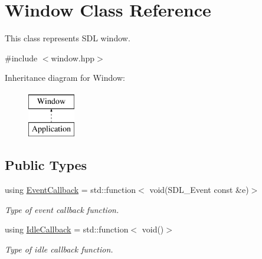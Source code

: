 \hypertarget{classWindow}{}\section{Window Class Reference}
\label{classWindow}


This class represents S\+DL window.  




{\ttfamily \#include $<$window.\+hpp$>$}

Inheritance diagram for Window\+:\begin{figure}[H]
\begin{center}
\leavevmode
\includegraphics[height=2.000000cm]{classWindow}
\end{center}
\end{figure}
\subsection*{Public Types}
\begin{DoxyCompactItemize}
\item 
\mbox{\label{classWindow_a0e7a1332f3c35705eeed4d7b1a568d61}} 
using \hyperlink{classWindow_a0e7a1332f3c35705eeed4d7b1a568d61}{Event\+Callback} = std\+::function$<$ void(S\+D\+L\+\_\+\+Event const  \&e)$>$
\begin{DoxyCompactList}\small\item\em Type of event callback function. \end{DoxyCompactList}\item 
\mbox{\label{classWindow_ae666e38583ffdec789fdfc85d6504d73}} 
using \hyperlink{classWindow_ae666e38583ffdec789fdfc85d6504d73}{Idle\+Callback} = std\+::function$<$ void()$>$
\begin{DoxyCompactList}\small\item\em Type of idle callback function. \end{DoxyCompactList}\end{DoxyCompactItemize}
